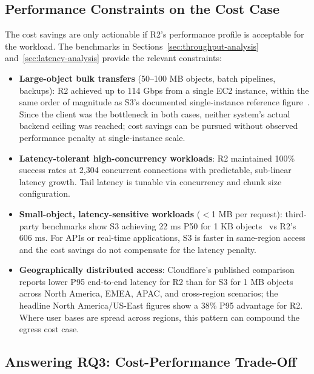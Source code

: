 \subsection{Performance Constraints on the Cost Case}

The cost savings are only actionable if R2's performance profile is acceptable for the workload. The benchmarks in Sections~\ref{sec:throughput-analysis} and~\ref{sec:latency-analysis} provide the relevant constraints:

\begin{itemize}
    \item \textbf{Large-object bulk transfers} (50--100 MB objects, batch pipelines, backups): R2 achieved up to 114 Gbps from a single EC2 instance, within the same order of magnitude as S3's documented single-instance reference figure~\cite{aws-s3-performance}. Since the client was the bottleneck in both cases, neither system's actual backend ceiling was reached; cost savings can be pursued without observed performance penalty at single-instance scale.

    \item \textbf{Latency-tolerant high-concurrency workloads}: R2 maintained 100\% success rates at 2,304 concurrent connections with predictable, sub-linear latency growth. Tail latency is tunable via concurrency and chunk size configuration.

    \item \textbf{Small-object, latency-sensitive workloads} ($<$1 MB per request): third-party benchmarks show S3 achieving 22 ms P50 for 1 KB objects~\cite{tigris-benchmark} vs R2's 606 ms. For APIs or real-time applications, S3 is faster in same-region access and the cost savings do not compensate for the latency penalty.

    \item \textbf{Geographically distributed access}: Cloudflare's published comparison~\cite{cloudflare-r2-faster-s3} reports lower P95 end-to-end latency for R2 than for S3 for 1 MB objects across North America, EMEA, APAC, and cross-region scenarios; the headline North America/US-East figures show a 38\% P95 advantage for R2. Where user bases are spread across regions, this pattern can compound the egress cost case.
\end{itemize}

\subsection{Answering RQ3: Cost-Performance Trade-Off}

